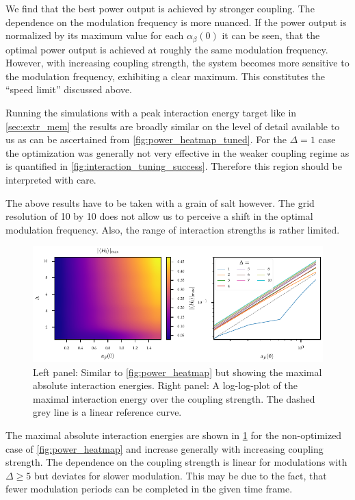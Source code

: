 We find that the best power output is achieved by stronger
coupling. The dependence on the modulation frequency is more
nuanced. If the power output is normalized by its maximum value for
each \(α_{β}(0)\) it can be seen, that the optimal power output is
achieved at roughly the same modulation frequency. However, with
increasing coupling strength, the system becomes more sensitive to the
modulation frequency, exhibiting a clear maximum. This constitutes the
``speed limit'' discussed above.

Running the simulations with a peak interaction energy target like in
\cref{sec:extr_mem} the results are broadly similar on the level of
detail available to us as can be ascertained from
\cref{fig:power_heatmap_tuned}. For the \(Δ=1\) case the optimization
was generally not very effective in the weaker coupling regime as is
quantified in \cref{fig:interaction_tuning_success}. Therefore this
region should be interpreted with care.

The above results have to be taken with a grain of salt however. The grid
resolution of 10 by 10 does not allow us to perceive a shift in the
optimal modulation frequency. Also, the range of interaction strengths
is rather limited.


\begin{figure}[htp]
  \centering
  \includegraphics{figs/one_bath_mod/interaction_nontuned}
  \caption{\label{fig:interaction_nontuned} Left panel: Similar to
    \cref{fig:power_heatmap} but showing the maximal absolute
    interaction energies. Right panel: A log-log-plot of the maximal
    interaction energy over the coupling strength. The dashed grey
    line is a linear reference curve.}
\end{figure}

The maximal absolute interaction energies are shown in
\cref{fig:interaction_nontuned} for the non-optimized case of
\cref{fig:power_heatmap} and increase generally with increasing
coupling strength. The dependence on the coupling strength is linear
for modulations with \(Δ\geq 5\) but deviates for slower
modulation. This may be due to the fact, that fewer modulation periods
can be completed in the given time frame.

